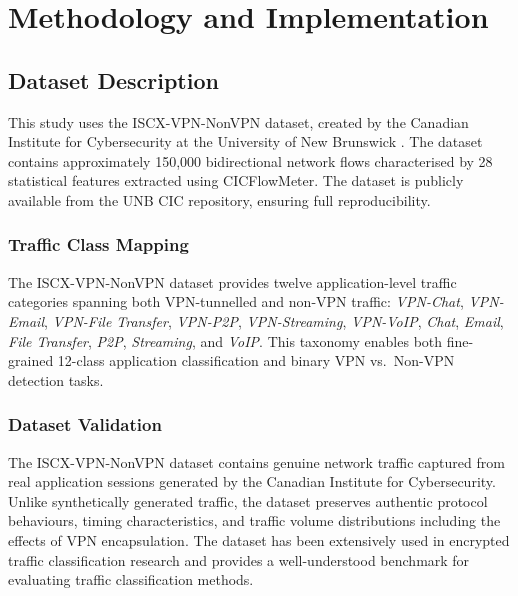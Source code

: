 \documentclass[conference]{IEEEtran}
\begin{document}
\section{Methodology and Implementation}
\label{sec:method}

\subsection{Dataset Description}
\label{ssec:dataset}

This study uses the ISCX-VPN-NonVPN dataset, created by the Canadian Institute
for Cybersecurity at the University of New Brunswick \cite{draper2016}. The
dataset contains approximately 150,000 bidirectional network flows characterised
by 28 statistical features extracted using CICFlowMeter. The dataset is publicly
available from the UNB CIC repository, ensuring full reproducibility.

\subsubsection{Traffic Class Mapping}

The ISCX-VPN-NonVPN dataset provides twelve application-level traffic categories
spanning both VPN-tunnelled and non-VPN traffic: \textit{VPN-Chat},
\textit{VPN-Email}, \textit{VPN-File Transfer}, \textit{VPN-P2P},
\textit{VPN-Streaming}, \textit{VPN-VoIP}, \textit{Chat}, \textit{Email},
\textit{File Transfer}, \textit{P2P}, \textit{Streaming}, and \textit{VoIP}.
This taxonomy enables both fine-grained 12-class application classification
and binary VPN vs.\ Non-VPN detection tasks.

\subsubsection{Dataset Validation}
\label{sssec:datasetvalidation}

The ISCX-VPN-NonVPN dataset contains genuine network traffic captured from
real application sessions generated by the Canadian Institute for Cybersecurity.
Unlike synthetically generated traffic, the dataset preserves authentic protocol
behaviours, timing characteristics, and traffic volume distributions including
the effects of VPN encapsulation. The dataset has been extensively used in
encrypted traffic classification research and provides a well-understood
benchmark for evaluating traffic classification methods.
\end{document}

